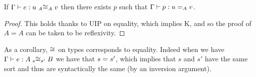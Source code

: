 \begin{lemma}
  \label{lem:uip-cong}
  If $\isterm{\Ga}{e}{\Heq{A}{u}{A}{v}}$
  then there exists $p$ such that $\isterm{\Ga}{p}{\Eq{A}{u}{v}}$.
\end{lemma}

\begin{proof}
  This holds thanks to UIP on equality, which implies K, and so the
  proof of $A = A$ can be taken to be reflexivity.
\end{proof}

\begin{remark}
  As a corollary, $\Heqs$ on types corresponds to equality.
  Indeed when we have $\isterm{\Ga}{e}{\Heq{s}{A}{s'}{B}}$ we have
  that $\Eq{}{s}{s'}$, which implies that $s$ and $s'$ have the same sort
  and thus are syntactically the same (by an inversion argument).
\end{remark}

